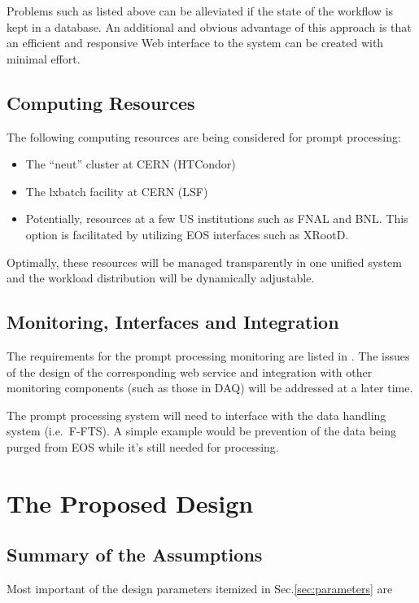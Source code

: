 \documentclass[pdftex,12pt,letter]{article}
\begin{document}
\noindent Problems such as listed above can be alleviated if the state of the workflow is kept in a database.
An additional and obvious advantage of this approach is that an efficient and responsive Web interface to
the system can be created with minimal effort.

\subsection{Computing Resources}
The following computing resources are being considered for prompt processing:
\begin{itemize}

\item The ``neut'' cluster  \cite{neut} at CERN (HTCondor)

\item The lxbatch facility \cite{lxbatch} at CERN (LSF)

\item Potentially, resources at a few US institutions such as FNAL and BNL.  This option is facilitated by utilizing EOS interfaces such as XRootD.

\end{itemize}

\noindent Optimally, these resources will be managed transparently in one unified system and the workload
distribution will be dynamically adjustable.

\subsection{Monitoring, Interfaces and Integration}
The requirements for the prompt processing monitoring are listed in \cite{docdb1811}.
The issues of the design of the corresponding web service and integration with other monitoring
components (such as those in DAQ) will be addressed at a later time.

The prompt processing system will need to interface with the data handling system (i.e.~F-FTS). A simple example
would be prevention of the data being purged from EOS while it's still needed for processing.

\section{The Proposed Design}
\label{sec:design}
\subsection{Summary of the Assumptions}
Most important of the design parameters itemized in Sec.\ref{sec:parameters} are
\end{document}
